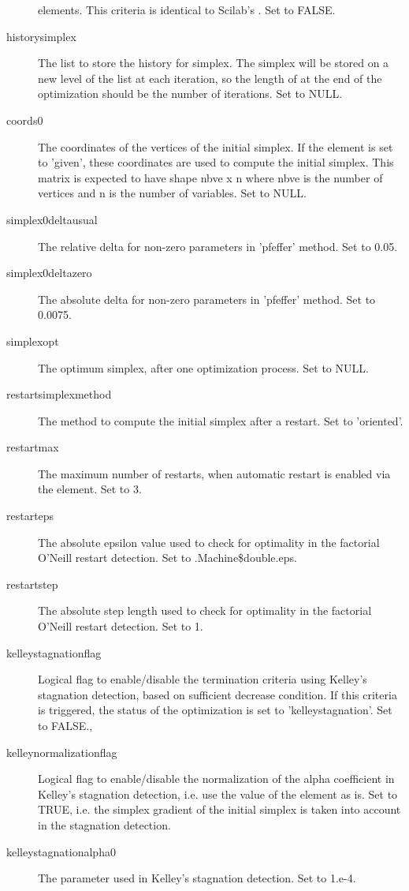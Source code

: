 \begin{Value}
\begin{description}
elements. This criteria is identical to Scilab's . Set to
FALSE.
\item[historysimplex] The list to store the history for simplex. The simplex
will be stored on a new level of the list at each iteration, so the
length 
of  at the end of the optimization should be the number
of iterations. Set to NULL.
\item[coords0] The coordinates of the vertices of the initial simplex. If
the  element is set to 'given', these coordinates are
used to compute the initial simplex. This matrix is expected to have
shape nbve x n where nbve is the number of vertices and n is the number of
variables. Set to NULL.
\item[simplex0deltausual] The relative delta for non-zero parameters in
'pfeffer' method. Set to 0.05.
\item[simplex0deltazero] The absolute delta for non-zero parameters in
'pfeffer' method. Set to 0.0075.
\item[simplexopt] The optimum simplex, after one optimization process. Set
to NULL.
\item[restartsimplexmethod] The method to compute the initial simplex after
a restart. Set to 'oriented'.
\item[restartmax] The maximum number of restarts, when automatic restart is
enabled via the  element. Set to 3.
\item[restarteps] The absolute epsilon value used to check for optimality in
the factorial O'Neill restart detection. Set to .Machine\$double.eps.
\item[restartstep] The absolute step length used to check for optimality in
the factorial O'Neill restart detection. Set to 1.
\item[kelleystagnationflag] Logical flag to enable/disable the termination
criteria using Kelley's stagnation detection, based on sufficient decrease
condition. If this criteria is triggered, the status of the optimization
is set to 'kelleystagnation'. Set to FALSE.,
\item[kelleynormalizationflag] Logical flag to enable/disable the
normalization of the alpha coefficient in Kelley's stagnation detection,
i.e. use the value of the  element as is.
Set to TRUE, i.e. the simplex gradient of the initial simplex is taken
into account in the stagnation detection.
\item[kelleystagnationalpha0] The parameter used in Kelley's stagnation
detection. Set to 1.e-4.

\end{description}
\end{Value}
